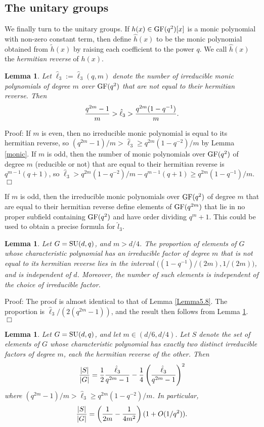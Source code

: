 \documentclass[12pt]{article}
\newtheorem{lemma}[definition]{Lemma}
\newenvironment{proof}{\normalsize {\sc Proof}:}{{\hfill $\Box$ \\}}
\def\Oh{O}  %
\def\GF{{\rm GF}}
\def\SU{{\rm SU}}
\def\ADD{Moreover, the number of such elements is
independent of the choice of irreducible factor.}
\begin{document}
\subsection{The unitary groups}
We finally turn to the unitary groups. 
If $h(x)\in\GF(q^2)[x]$ is a  monic polynomial 
with non-zero constant term,
then define $\hat{h}(x)$ to be 
the monic polynomial obtained from $\tilde{h}(x)$ by raising each
coefficient to the power $q$.  
We call $\hat{h}(x)$ the \emph{hermitian reverse} of $h(x)$.

\begin{lemma}\label{lhat}
Let $\hat{\ell}_3:=\hat{\ell}_3(q,m)$ denote the number of irreducible 
monic polynomials 
of degree $m$ over $\GF(q^2)$
that are not equal to their hermitian reverse. Then
$${q^{2m}-1\over m}>\hat{\ell}_3 > {q^{2m}(1-q^{-1})\over m}.$$
\end{lemma}
\begin{proof}
If $m$ is even, then no irreducible monic polynomial is equal 
to its hermitian reverse, so
$(q^{2m}-1)/m>\hat{\ell}_3\ge q^{2m}(1-q^{-2})/m$
by Lemma \ref{monic}.
If $m$ is odd, then the number of monic polynomials 
over $\GF(q^2)$ of degree $m$ (reducible or not) that are equal
to their hermitian reverse is $q^{m-1}(q+1)$, 
so $\hat{\ell}_3>q^{2m}(1-q^{-2})/m-q^{m-1}(q+1)
\ge q^{2m}(1-q^{-1})/m$.
\end{proof}

If $m$ is odd, then the irreducible monic polynomials
over $\GF(q^2)$ of degree $m$ that are equal to their
hermitian reverse define elements of $\GF(q^{2m})$
that lie in no proper subfield containing $\GF(q^2)$ and 
have order dividing $q^m + 1$. This could
be used to obtain a precise formula for $\hat{l}_3$.

\begin{lemma}\label{Unitarya} 
Let $G=\SU(d,q)$, and $m>d/4$.
The proportion of elements of
$G$ whose characteristic polynomial has an irreducible factor of degree $m$
that is not equal to its hermitian reverse lies in the interval 
$\big((1-q^{-1})/(2m), 1/(2m)\big)$, and 
is independent of $d$. \ADD
\end{lemma}
\begin{proof}
The proof is almost identical to that of Lemma \ref{Lemma5.8}.
The proportion is $\hat{\ell}_3/(2(q^{2m}-1))$, and the result then follows
from Lemma \ref{lhat}.
\end{proof}

\begin{lemma}\label{Unitaryb} 
Let $G=\SU(d,q)$, and let $m\in(d/6,d/4)$. 
Let $S$ denote the set of elements of $G$ 
whose characteristic polynomial
has exactly two distinct irreducible factors of degree $m$, each the 
hermitian reverse of the other.  Then 
$${\vert S\vert\over\vert G\vert}={1\over2}{\hat{\ell}_3\over q^{2m}-1} - 
{1\over4}\left({\hat{\ell}_3\over q^{2m}-1}\right)^2$$
where $(q^{2m}-1)/m>\hat{\ell}_3\ge q^{2m}(1-q^{-2})/m$.
In particular,
$${\vert S\vert\over\vert G\vert}=
\left({1\over2m}-{1\over4m^2}\right)(1+\Oh(1/q^2)).$$
\end{lemma}
\end{document}
